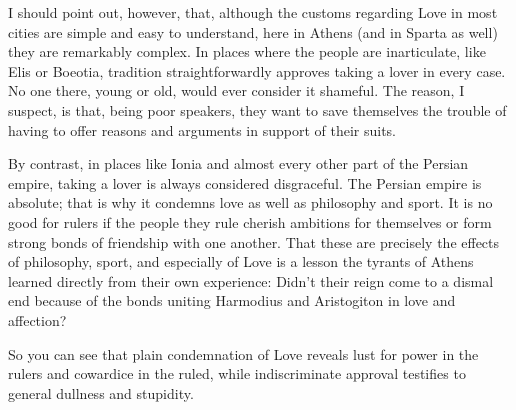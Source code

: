 I should point out, however, that, although the customs regarding Love
in most cities are simple and easy to understand, here in Athens (and in
 Sparta as well) they are remarkably complex. In places where the
people are inarticulate, like Elis or Boeotia, tradition
straightforwardly approves taking a lover in every case. No one there,
young or old, would ever consider it shameful. The reason, I suspect, is
that, being poor speakers, they want to save themselves the trouble of
having to offer reasons and arguments in support of their suits.

By contrast, in places like Ionia and almost every other part of the
Persian empire, taking a lover is always considered disgraceful. The
Persian empire is absolute; that is why it condemns love as well as
philosophy and sport.  It is no good for rulers if the people
they rule cherish ambitions for themselves or form strong bonds of
friendship with one another. That these are precisely the effects of
philosophy, sport, and especially of Love is a lesson the tyrants of
Athens learned directly from their own experience: Didn't their reign
come to a dismal end because of the bonds uniting Harmodius and
Aristogiton in love and
affection? 

So you can see that plain condemnation of Love reveals lust for power in
the rulers and cowardice in the ruled, while indiscriminate approval
testifies to general dullness and stupidity.

